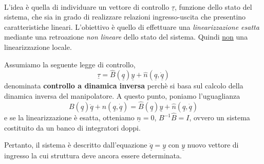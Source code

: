 \paragraph{}
L'idea è quella di individuare un vettore di controllo $\underline{\tau}$, funzione dello stato del sistema, che sia in grado di realizzare relazioni ingresso-uscita che presentino caratteristiche lineari. L'obiettivo è quello di effettuare una \emph{linearizzazione esatta} mediante una retroazione \emph{non lineare} dello stato del sistema. Quindi \underline{non} una linearizzazione locale. 

Assumiamo la seguente legge di controllo,
\begin{equation}
	\underline{\tau} = \hat{B}(\underline{q})\underline{y} + \hat{n}(\underline{q}, \underline{\dot{q}})
\end{equation}
denominata \textbf{controllo a dinamica inversa} perchè si basa sul calcolo della dinamica inversa del manipolatore. A questo punto, poniamo l'uguaglianza
\begin{equation}
	B(\underline{q})\underline{\ddot{q}} + n(\underline{q}, \underline{\dot{q}}) = \hat{B}(\underline{q})\underline{y} + \hat{n}(\underline{q}, \underline{\dot{q}})
\end{equation}
e se la linearizzazione è esatta, otteniamo $\underline{n} = 0$, $B^{-1}\hat{B} = I$, ovvero un sistema costituito da un banco di integratori doppi.

Pertanto, il sistema è descritto dall'equazione $\underline{\ddot{q}} = \underline{y}$ con $\underline{y}$ nuovo vettore di ingresso la cui struttura deve ancora essere determinata.

